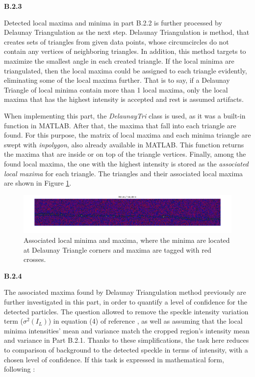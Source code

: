 \documentclass{article}
\begin{document}
\textbf{B.2.3}

Detected local maxima and minima in part B.2.2 is further processed by Delaunay Triangulation\cite{delaunaywiki}\cite{delaunaymathworks} as the next step. Delaunay Triangulation is method, that creates sets of triangles from given data points, whose circumcircles do not contain any vertices of neighboring triangles. In addition, this method targets to maximize the smallest angle in each created triangle. If the local minima are triangulated, then the local maxima could be assigned to each triangle evidently, eliminating some of the local maxima further. That is to say, if a Delaunay Triangle of local minima contain more than 1 local maxima, only the local maxima that has the highest intensity is accepted and rest is assumed artifacts.

When implementing this part, the \emph{DelaunayTri} class is used, as it was a built-in function in MATLAB. After that, the maxima that fall into each triangle are found. For this purpose, the matrix of local maxima and each minima triangle are swept with \emph{inpolygon}, also already available in MATLAB. This function returns the maxima that are inside or on top of the triangle vertices. Finally, among the found local maxima, the one with the highest intensity is stored as the \emph{associated local maxima} for each triangle. The triangles and their associated local maxima are shown in Figure \ref{fig:assocLocal}.

\begin{figure}[h]
\centering
\includegraphics[width=16cm]{figures/assocLocalExtrema.png}
\caption{Associated local minima and maxima, where the minima are located at Delaunay Triangle corners and maxima are tagged with red crosses.}
\label{fig:assocLocal}
\end{figure}



\textbf{B.2.4}
 
The associated maxima found by Delaunay Triangulation method previously are further investigated in this part, in order to quantify a level of confidence for the detected particles. The question allowed to remove the speckle intensity variation term ($\sigma^2(I_L)$) in equation (4) of reference \cite{ponti}, as well as assuming that the local minima intensities' mean and variance match the cropped region's intensity mean and variance in Part B.2.1. Thanks to these simplifications, the task here reduces to comparison of background to the detected speckle in terms of intensity, with a chosen level of confidence. If this task is expressed in mathematical form, following \cite{ponti}:
\end{document}

